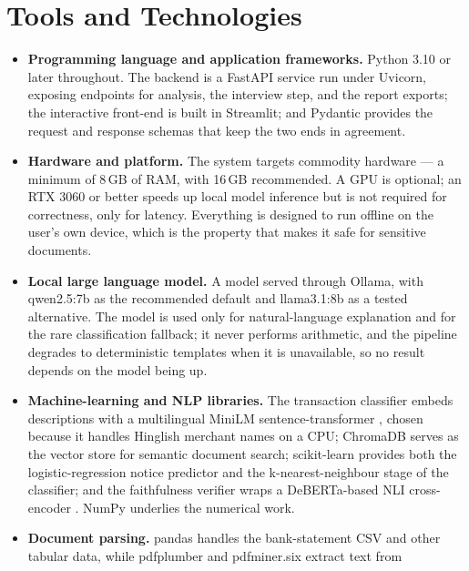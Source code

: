 \documentclass[12pt, a4paper, oneside]{report}
\begin{document}
\section{Tools and Technologies}
\label{sec:tools}

\begin{itemize}
    \item \textbf{Programming language and application frameworks.} Python 3.10
          or later throughout. The backend is a FastAPI service run under
          Uvicorn, exposing endpoints for analysis, the interview step, and the
          report exports; the interactive front-end is built in Streamlit; and
          Pydantic provides the request and response schemas that keep the two
          ends in agreement.
    \item \textbf{Hardware and platform.} The system targets commodity hardware
          --- a minimum of 8\,GB of RAM, with 16\,GB recommended. A GPU is
          optional; an RTX 3060 or better speeds up local model inference but is
          not required for correctness, only for latency. Everything is designed
          to run offline on the user's own device, which is the property that
          makes it safe for sensitive documents.
    \item \textbf{Local large language model.} A model served through Ollama,
          with qwen2.5:7b as the recommended default and llama3.1:8b as a tested
          alternative. The model is used only for natural-language explanation
          and for the rare classification fallback; it never performs
          arithmetic, and the pipeline degrades to deterministic templates when
          it is unavailable, so no result depends on the model being up.
    \item \textbf{Machine-learning and NLP libraries.} The transaction classifier
          embeds descriptions with a multilingual MiniLM sentence-transformer
          \cite{ref10}, chosen because it handles Hinglish merchant names on a
          CPU; ChromaDB serves as the vector store for semantic document search;
          scikit-learn \cite{ref11} provides both the logistic-regression notice
          predictor and the k-nearest-neighbour stage of the classifier; and the
          faithfulness verifier wraps a DeBERTa-based NLI cross-encoder
          \cite{ref9}. NumPy underlies the numerical work.
    \item \textbf{Document parsing.} pandas handles the bank-statement CSV and
          other tabular data, while pdfplumber and pdfminer.six extract text from

\end{itemize}
\end{document}
